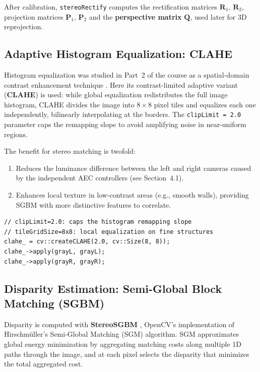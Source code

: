 \documentclass[12pt, a4paper]{article}
\begin{document}
After calibration, \texttt{stereoRectify} computes the rectification matrices
$\mathbf{R}_1$, $\mathbf{R}_2$, projection matrices $\mathbf{P}_1$, $\mathbf{P}_2$
and the \textbf{perspective matrix} $\mathbf{Q}$, used later for 3D reprojection.

\subsection{Adaptive Histogram Equalization: CLAHE}
\label{sec:clahe}

Histogram equalization was studied in Part~2 of the course as a spatial-domain
contrast enhancement technique \cite{robles2026parte2}. Here its contrast-limited
adaptive variant (\textbf{CLAHE}) \cite{pizer1987adaptive} is used: while global
equalization redistributes the full image histogram, CLAHE divides the image into
$8\times8$ pixel tiles and equalizes each one independently, bilinearly interpolating
at the borders. The \texttt{clipLimit = 2.0} parameter caps the remapping slope to
avoid amplifying noise in near-uniform regions.

The benefit for stereo matching is twofold:
\begin{enumerate}
  \item Reduces the luminance difference between the left and right cameras caused
        by the independent AEC controllers (see Section~4.1).
  \item Enhances local texture in low-contrast areas (e.g., smooth walls), providing
        SGBM with more distinctive features to correlate.
\end{enumerate}

\begin{lstlisting}[style=cppstyle, caption={CLAHE application in StereoProcessor.cpp.}]
// clipLimit=2.0: caps the histogram remapping slope
// tileGridSize=8x8: local equalization on fine structures
clahe_ = cv::createCLAHE(2.0, cv::Size(8, 8));
clahe_->apply(grayL, grayL);
clahe_->apply(grayR, grayR);
\end{lstlisting}

\subsection{Disparity Estimation: Semi-Global Block Matching (SGBM)}

Disparity is computed with \textbf{StereoSGBM} \cite{hirschmuller2008stereo},
OpenCV's implementation of Hirschm\"uller's Semi-Global Matching (SGM) algorithm.
SGM approximates global energy minimization by aggregating matching costs along
multiple 1D paths through the image, and at each pixel selects the disparity that
minimizes the total aggregated cost.
\end{document}
